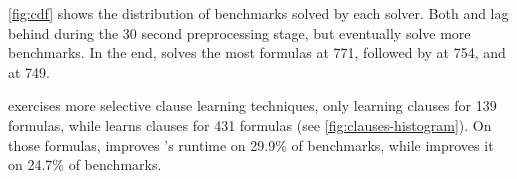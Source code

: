 \autoref{fig:cdf} shows the distribution of benchmarks solved by each solver.
Both \prelearn and \tool lag behind \cadical during the 30 second preprocessing
stage, but eventually solve more benchmarks. In the end, \prelearn solves the most
formulas at 771, followed by \tool at 754, and \cadical at 749. 






\tool exercises more selective \pr clause learning techniques, only learning \pr
clauses for 139 formulas, while \prelearn learns \pr clauses for 431 formulas
(see \autoref{fig:clauses-histogram}). On those formulas, \tool improves
\cadical's runtime on 29.9\% of benchmarks, while \prelearn improves it on
24.7\% of benchmarks.





















